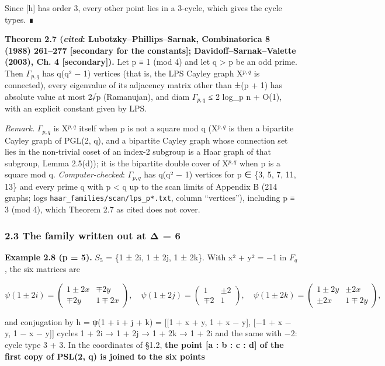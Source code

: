 \documentclass[
  10pt,
]{article}
\begin{document}
Since {[}h{]} has order 3, every other point lies in a 3-cycle, which
gives the cycle types. ∎

\textbf{Theorem 2.7 (\emph{cited}: Lubotzky--Phillips--Sarnak,
Combinatorica 8 (1988) 261--277 {[}secondary for the constants{]};
Davidoff--Sarnak--Valette (2003), Ch. 4 {[}secondary{]}).} Let p ≡ 1
(mod 4) and let q \textgreater{} p be an odd prime. Then \(Γ_{p,q}\) has
q(q² − 1) vertices (that is, the LPS Cayley graph X\(^{p,q}\) is
connected), every eigenvalue of its adjacency matrix other than ±(p + 1)
has absolute value at most 2√p (Ramanujan), and diam \(Γ_{p,q}\) ≤ 2
log\_p n + O(1), with an explicit constant given by LPS.

\emph{Remark.} \(Γ_{p,q}\) is X\(^{p,q}\) itself when p is not a square
mod q (X\(^{p,q}\) is then a bipartite Cayley graph of PGL(2, q), and a
bipartite Cayley graph whose connection set lies in the non-trivial
coset of an index-2 subgroup is a Haar graph of that subgroup, Lemma
2.5(d)); it is the bipartite double cover of X\(^{p,q}\) when p is a
square mod q. \emph{Computer-checked}: \(Γ_{p,q}\) has q(q² − 1)
vertices for p ∈ \{3, 5, 7, 11, 13\} and every prime q with p
\textless{} q up to the scan limits of Appendix B (214 graphs; logs
\texttt{haar\_families/scan/lps\_p*.txt}, column ``vertices''),
including p ≡ 3 (mod 4), which Theorem 2.7 as cited does not cover.

\hypertarget{the-family-written-out-at-ux3b4-6}{%
\subsubsection{2.3 The family written out at Δ =
6}\label{the-family-written-out-at-ux3b4-6}}

\textbf{Example 2.8 (p = 5).} \(S_{5}\) = \{1 ± 2i, 1 ± 2j, 1 ± 2k\}.
With x² + y² = −1 in \(F_{q}\), the six matrices are

\[\psi(1 \pm 2i) = \begin{pmatrix} 1 \pm 2x & \mp 2y \\ \mp 2y & 1 \mp 2x\end{pmatrix},\quad
\psi(1 \pm 2j) = \begin{pmatrix} 1 & \pm 2 \\ \mp 2 & 1\end{pmatrix},\quad
\psi(1 \pm 2k) = \begin{pmatrix} 1 \pm 2y & \pm 2x \\ \pm 2x & 1 \mp 2y\end{pmatrix},\]

and conjugation by h = ψ(1 + i + j + k) = {[}{[}1 + x + y, 1 + x − y{]},
{[}−1 + x − y, 1 − x − y{]}{]} cycles 1 + 2i → 1 + 2j → 1 + 2k → 1 + 2i
and the same with −2: cycle type 3 + 3. In the coordinates of §1.2,
\textbf{the point {[}a : b : c : d{]} of the first copy of PSL(2, q) is
joined to the six points}
\end{document}
